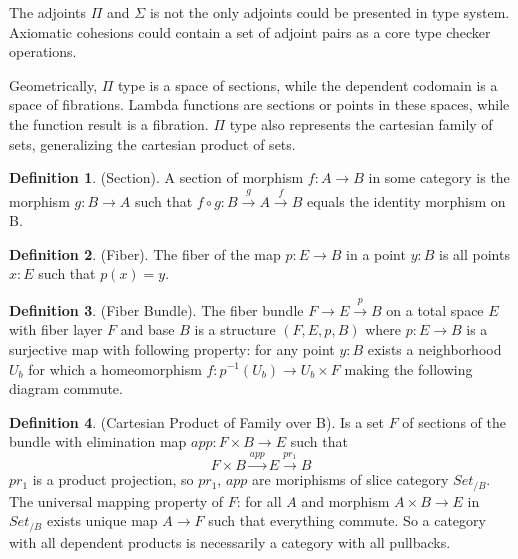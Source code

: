 \documentclass{article}
\theoremstyle{definition}
\newtheorem{definition}{Definition}
\def\mapright#1{\xrightarrow{{#1}}}
\begin{document}
The adjoints $\Pi$ and $\Sigma$ is not the only adjoints could be presented in type system.
Axiomatic cohesions could contain a set of adjoint pairs as a core type checker operations.

Geometrically, $\Pi$ type is a space of sections, while the dependent codomain is a space of fibrations.
Lambda functions are sections or points in these spaces, while the function result is a fibration.
$\Pi$ type also represents the cartesian family of sets, generalizing the cartesian product of sets.

\begin{definition} (Section).
A section of morphism $f: A \rightarrow B$ in some category is the morphism $g: B \rightarrow A$
such that $f \circ g: B \mapright{g} A \mapright{f} B$ equals the identity morphism on B.
\end{definition}

\begin{definition} (Fiber).
The fiber of the map $p: E \rightarrow B$ in a point $y: B$ is all points $x: E$ such that $p(x)=y$.
\end{definition}

\begin{definition} (Fiber Bundle).
The fiber bundle $ F \rightarrow E \mapright{p} B$ on a total space $E$ with fiber layer $F$ and base $B$ is a
structure $(F,E,p,B)$ where $p: E \rightarrow B$ is a surjective map with following property:
for any point $y: B$ exists a neighborhood $U_b$ for which a homeomorphism $f: p^{-1}(U_b) \rightarrow U_b \times F$
making the following diagram commute.
\begin{center}
\end{center}
\end{definition}

\begin{definition} (Cartesian Product of Family over B).
Is a set $F$ of sections of the bundle with elimination map $app : F \times B \rightarrow E$ such that
\begin{equation}
F \times B \mapright{app} E \mapright{pr_1} B
\end{equation}
$pr_1$ is a product projection, so $pr_1$, $app$ are moriphisms
of slice category $Set_{/B}$. The universal mapping property of $F$:
for all $A$ and morphism $A \times B \rightarrow E$ in $Set_{/B}$ exists
unique map $A \rightarrow F$ such that everything commute. So a category
with all dependent products is necessarily a category with all pullbacks.
\end{definition}
\end{document}
